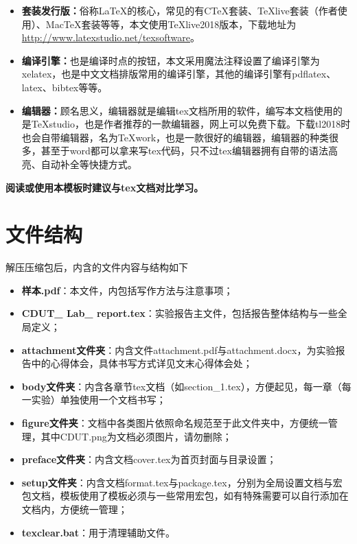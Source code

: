 \begin{itemize}
\item \textbf{套装发行版：}俗称\LaTeX 的核心，常见的有CTeX套装、TeXlive套装（作者使用）、MacTeX套装等等，本文使用TeXlive2018版本，下载地址为\url{http://www.latexstudio.net/texsoftware}。

\item \textbf{编译引擎：}也是编译时点的按钮，本文采用魔法注释设置了编译引擎为xelatex，也是中文文档排版常用的编译引擎，其他的编译引擎有pdflatex、latex、bibtex等等。
 
\item \textbf{编辑器：}顾名思义，编辑器就是编辑tex文档所用的软件，编写本文档使用的是TeXstudio，也是作者推荐的一款编辑器，网上可以免费下载。下载tl2018时也会自带编辑器，名为TeXwork，也是一款很好的编辑器，编辑器的种类很多，甚至于word都可以拿来写tex代码，只不过tex编辑器拥有自带的语法高亮、自动补全等快捷方式。
\end{itemize}

\textbf{阅读或使用本模板时建议与tex文档对比学习。}

\section{文件结构}
解压压缩包后，内含的文件内容与结构如下
\begin{itemize}
\item \textbf{样本.pdf}：本文件，内包括写作方法与注意事项；
\item \textbf{CDUT\_ Lab\_ report.tex}：实验报告主文件，包括报告整体结构与一些全局定义；
\item \textbf{attachment文件夹}：内含文件attachment.pdf与attachment.docx，为实验报告中的心得体会，具体书写方式详见文末心得体会处；
\item \textbf{body文件夹}：内含各章节tex文档（如section\_1.tex），方便起见，每一章（每一实验）单独使用一个文档书写；
\item \textbf{figure文件夹}：文档中各类图片依照命名规范至于此文件夹中，方便统一管理，其中CDUT.png为文档必须图片，请勿删除；
\item \textbf{preface文件夹}：内含文档cover.tex为首页封面与目录设置；
\item \textbf{setup文件夹}：内含文档format.tex与package.tex，分别为全局设置文档与宏包文档，模板使用了模板必须与一些常用宏包，如有特殊需要可以自行添加在文档内，方便统一管理；
\item \textbf{texclear.bat}：用于清理辅助文件。
\end{itemize}

